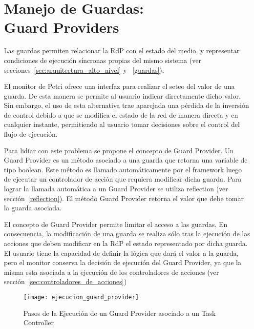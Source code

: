 \section{Manejo de Guardas: \\ Guard Providers}
\label{sec:guard_providers}
Las guardas permiten relacionar la RdP con el estado del medio, y representar
condiciones de ejecución síncronas propias del mismo sistema (ver
secciones~\ref{sec:arquitectura_alto_nivel} y ~\ref{guardas}).

El monitor de Petri ofrece una interfaz para realizar el seteo del valor
de una guarda. De esta manera se permite al usuario indicar directamente
dicho valor. Sin embargo, el uso de esta alternativa trae aparejada una pérdida
de la inversión de control debido a que se modifica el estado
de la red de manera directa y en cualquier instante, permitiendo al usuario tomar
decisiones sobre el control del flujo de ejecución.

Para lidiar con este problema se propone el concepto de Guard Provider. Un Guard
Provider es un método asociado a una guarda que retorna una variable de tipo
boolean. Este método es llamado automáticamente por el framework luego de
ejecutar un controlador de acción que requiera modificar dicha guarda. Para
lograr la llamada automática a un Guard Provider se utiliza reflection (ver
sección~\ref{reflection}). El método Guard Provider retorna el valor que debe
tomar la guarda asociada.

El concepto de Guard Provider permite limitar el acceso a las
guardas. En consecuencia, la modificación de una guarda se realiza sólo tras
la ejecución de las acciones que deben modificar en la RdP el estado
representado por dicha guarda. El usuario tiene la capacidad de definir la
lógica que dará el valor a la guarda, pero el monitor conserva la decisión de
ejecución del Guard Provider, ya que la misma esta asociada a la ejecución de
los controladores de acciones (ver sección~\ref{sec:controladores_de_acciones})

\begin{figure}[H]
	\centering
	\texttt{[image: ejecucion\_guard\_provider]}
	\caption{Pasos de la Ejecución de un Guard Provider asociado a un Task
	Controller }
	\label{fig:ejecucion_guard_provider}
\end{figure}